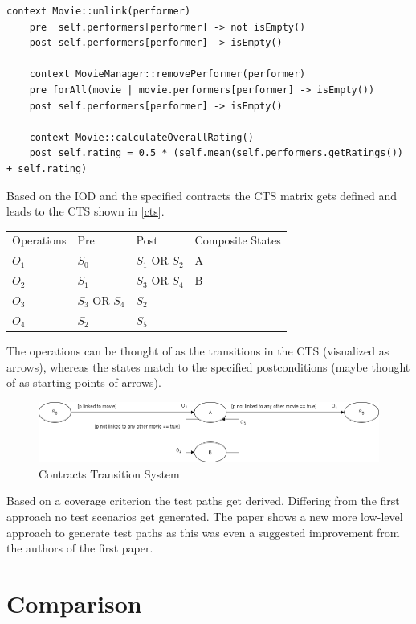 \begin{lstlisting}[caption={Contracts written in OCL},label={contracts2}]
	context Movie::unlink(performer)
	pre  self.performers[performer] -> not isEmpty()
	post self.performers[performer] -> isEmpty()
	
	context MovieManager::removePerformer(performer)
	pre forAll(movie | movie.performers[performer] -> isEmpty())
	post self.performers[performer] -> isEmpty()
	
	context Movie::calculateOverallRating()
	post self.rating = 0.5 * (self.mean(self.performers.getRatings()) + self.rating)
\end{lstlisting}

Based on the IOD and the specified contracts the CTS matrix gets defined and leads to the CTS shown in \autoref{cts}.

\begin{longtable}[h]{llll}
	Operations & Pre & Post & Composite States \\
	$O_{1}$ & $S_{0}$ & $S_{1}$ OR $S_{2}$ & A \\
	$O_{2}$ & $S_{1}$ & $S_{3}$ OR $S_{4}$ & B \\
	$O_{3}$ & $S_{3}$ OR $S_{4}$ & $S_{2}$ & \\
	$O_{4}$ & $S_{2}$ & $S_{5}$ & \\
\end{longtable}

The operations can be thought of as the transitions in the CTS (visualized as arrows), whereas the states match to the specified postconditions (maybe thought of as starting points of arrows).

\begin{figure}[h]
	\centering
	\includegraphics[width=\textwidth]{./images/cts.png}
	\caption{Contracts Transition System}
	\label{cts}
\end{figure}

Based on a coverage criterion the test paths get derived. Differing from the first approach no test scenarios get generated. The paper shows a new more low-level approach to generate test paths as this was even a suggested improvement from the authors of the first paper. 

\section{Comparison} \label{comparison}

